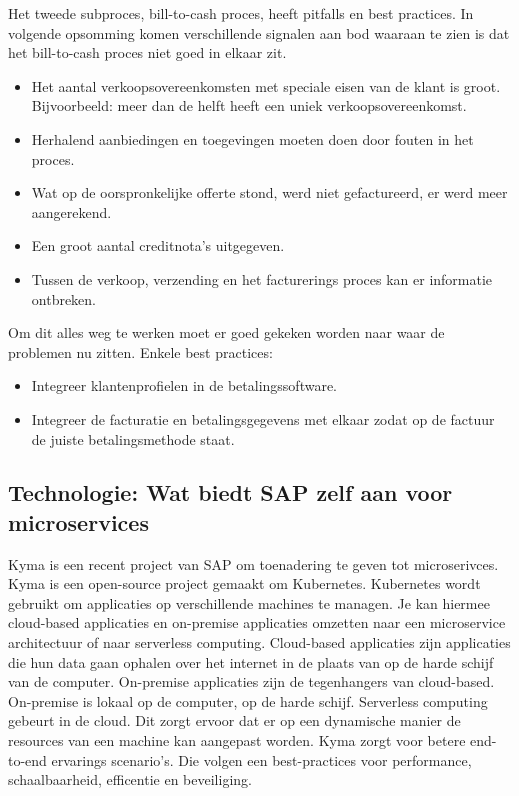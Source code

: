Het tweede subproces, bill-to-cash proces, heeft pitfalls en best practices.
In volgende opsomming komen verschillende signalen aan bod waaraan te zien is dat het bill-to-cash proces niet goed in elkaar zit.
\begin{itemize}
	\item Het aantal verkoopsovereenkomsten met speciale eisen van de klant is groot. Bijvoorbeeld: meer dan de helft heeft een uniek verkoopsovereenkomst.
	\item Herhalend aanbiedingen en toegevingen moeten doen door fouten in het proces.
	\item Wat op de oorspronkelijke offerte stond,  werd niet gefactureerd, er  werd meer aangerekend.
	\item Een groot aantal creditnota's uitgegeven.
	\item Tussen de verkoop, verzending en het facturerings proces kan er informatie ontbreken.
\end{itemize}
Om dit alles  weg te werken moet er goed gekeken worden naar waar de problemen nu zitten. Enkele best practices:
\begin{itemize}
	\item Integreer klantenprofielen in de betalingssoftware.
	\item Integreer de facturatie en betalingsgegevens met elkaar zodat op de factuur de juiste betalingsmethode staat.
\end{itemize}


\subsection{Technologie: Wat biedt SAP zelf aan voor microservices}

 Kyma is een recent project van SAP om toenadering te geven tot microserivces. Kyma is een open-source project gemaakt om Kubernetes. Kubernetes wordt gebruikt om applicaties op verschillende machines te managen. Je kan hiermee cloud-based applicaties en on-premise applicaties omzetten naar een microservice architectuur of naar serverless computing. Cloud-based applicaties zijn applicaties die hun data gaan ophalen over het internet in de plaats van op de harde schijf van de computer. On-premise applicaties zijn de tegenhangers van cloud-based. On-premise is lokaal op de computer, op de harde schijf. Serverless computing gebeurt in de cloud. Dit zorgt ervoor dat er op een dynamische manier de resources van een machine kan aangepast worden. 
Kyma zorgt voor betere end-to-end ervarings scenario's. Die volgen een best-practices voor performance, schaalbaarheid, efficentie en beveiliging. \textcite{Kyma2019}

